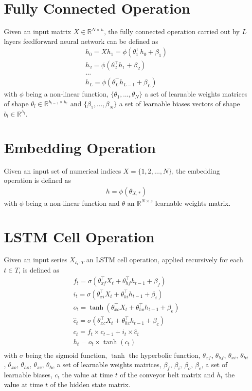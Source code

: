\section{Fully Connected Operation}
Given an input matrix $X \in \mathbb{R}^{N \times h}$, the fully connected operation carried out by $L$ layers feedforward neural network can be defined as
\begin{gather}
    \label{fnn_operation}
    h_0 = X
    h_1 = \phi(\theta_1^\top h_0 + \beta_1)\\ \nonumber
    h_2 = \phi(\theta_2^\top h_1  + \beta_2)\\ \nonumber
    \dots\\ \nonumber
    h_L = \phi(\theta_L^\top h_{L-1}  + \beta_L) \nonumber
\end{gather}
with $\phi$ being a non-linear function, $\{\theta_1, \dots, \theta_N\}$ a set of learnable weights matrices of shape $\theta_l \in \mathbb{R}^{h_{l-1} \times h_{l}}$ and $\{\beta_1, \dots, \beta_N\}$ a set of learnable biases vectors of shape $b_l \in \mathbb{R}^{h_l}$.

\section{Embedding Operation}
Given an input set of numerical indices $X = \{1, 2, \dots, N\}$, the embedding operation is defined as 
\begin{gather}
    \label{embedding_operation}
    h = \phi(\theta_{X,*})
\end{gather}
with $\phi$ being a non-linear function and $\theta$ an $\mathbb{R}^{N \times z}$ learnable weights matrix.

\section{LSTM Cell Operation}
Given an input series $X_{t_1:T}$ an LSTM cell operation, applied recursively for each $t \in T$, is defined as
\begin{gather}
    \label{lstm_operation}
    f_t = \sigma(\theta_{xf}^\top X_t + \theta_{hf}^\top h_{t-1} + \beta_f) \\ \nonumber
    i_t = \sigma(\theta_{xi}^\top X_t + \theta_{hi}^\top h_{t-1} + \beta_i) \\ \nonumber
    o_t = \tanh(\theta_{xo}^\top X_t + \theta_{ho}^\top h_{t-1} + \beta_o) \\ \nonumber
    \widehat{c}_t = \sigma(\theta_{xc}^\top X_t + \theta_{hc}^\top h_{t-1} + \beta_c) \\ \nonumber
    c_t = f_t \times c_{t-1} + i_t \times \widehat{c}_t \\ \nonumber
    h_t = o_t \times \tanh(c_t) \\ \nonumber
\end{gather}
with $\sigma$  being the sigmoid function, $\tanh$ the hyperbolic function, $\theta_{xf}$, $\theta_{hf}$, $\theta_{xi}$, $\theta_{hi}$, $\theta_{xo}$, $\theta_{ho}$, $\theta_{xc}$, $\theta_{hc}$ a set of learnable weights matrices, $\beta_f$, $\beta_i$, $\beta_o$, $\beta_c$, a set of learnable biases, $c_t$ the value at time $t$ of the conveyor belt matrix and $h_t$ the value at time $t$ of the hidden state matrix.

